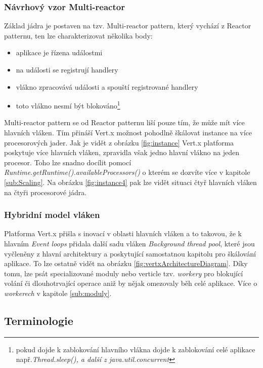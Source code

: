 \subsubsection{Návrhový vzor Multi-reactor}\label{sub:multireactor}

Základ jádra je postaven na tzv. Multi-reactor pattern\cite{eventLoops}, 
který vychází z Reactor patternu\cite{reactorPattern}, ten lze charakterizovat několika body:

\begin{itemize}
\item{aplikace je řízena událostmi}
\item{na události se registrují handlery}
\item{vlákno zpracovává události a spouští registrované handlery}
\item{toto vlákno nesmí být blokováno\footnote{pokud dojde k zablokování hlavního vlákna dojde k zablokování celé aplikace např.\emph{Thread.sleep(), a další z java.util.concurrent }}}
\end{itemize}

Multi-reactor pattern\cite{eventLoops} se od Reactor patternu liší pouze tím, že může mít více hlavních vláken. Tím přináší Vert.x možnost pohodlně škálovat instance na více procesorových jader. Jak je vidět z obrázku \vref{fig:instance} Vert.x platforma poskytuje více hlavních vláken, zpravidla však jedno hlavní vlákno na jeden procesor. Toho lze snadno docílit pomocí \emph{Runtime.getRuntime().availableProcessors()} o kterém se dozvíte více v kapitole \ref{sub:Scaling}. Na obrázku \vref{fig:instance4} pak lze vidět situaci čtyř hlavních vláken na čtyři procesorové jádra.

\subsubsection{Hybridní model vláken}\label{sub:hybrid}

Platforma Vert.x přišla s inovací v oblasti hlavních vláken a to takovou, že k hlavním \emph{Event loops} přidala další sadu vláken \emph{Background thread pool}, které jsou vyčleněny z hlavní architektury a poskytující samostatnou kapitolu pro škálování aplikace. To lze ostatně vidět na obrázku \vref{fig:vertxArchitectureDiagram}. Díky tomu, lze psát specializované moduly nebo verticle tzv. \emph{workery} pro blokující volání či dlouhotrvající operace aniž by nějak omezovaly běh celé aplikace. Více o \emph{workerech} v kapitole \ref{sub:moduly}.

\subsection{Terminologie}

